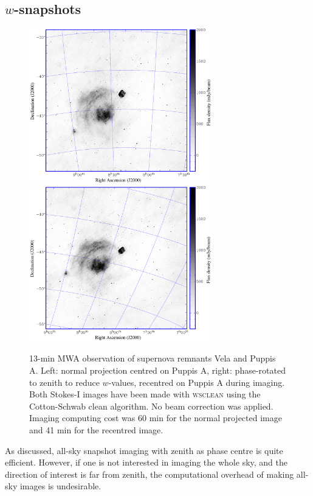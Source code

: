 \documentclass[useAMS,usenatbib]{mn2e}
\begin{document}
\subsection{$w$-snapshots} \label{sec:snapshot-imaging}
\begin{figure}
\begin{center}
\includegraphics[width=8cm]{img/vela-normal-projection}
\includegraphics[width=8cm]{img/vela-zenith-projection}
\caption{13-min MWA observation of supernova remnants Vela and Puppis A. Left: normal projection centred on Puppis A, right: phase-rotated to zenith to reduce $w$-values, recentred on Puppis A during imaging. Both Stokes-I images have been made with \textsc{wsclean} using the Cotton-Schwab clean algorithm. No beam correction was applied. Imaging computing cost was 60 min for the normal projected image and 41 min for the recentred image.}
\label{fig:vela-projection-example}
\end{center}
\end{figure}
As discussed, all-sky snapshot imaging with zenith as phase centre is quite efficient. However, if one is not interested in imaging the whole sky, and the direction of interest is far from zenith, the computational overhead of making all-sky images is undesirable.
\end{document}
